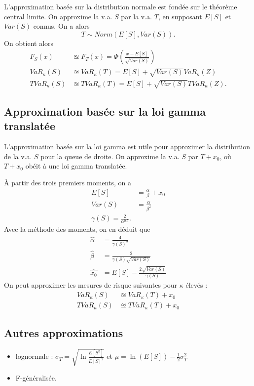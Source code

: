 L'approximation basée sur la distribution normale est fondée sur le théorème central limite. On approxime la v.a. $S$ par la v.a. $T$, en supposant $E[S]$ et $Var(S)$ connus. On a alors
$$T \sim Norm(E[S], Var(S)).$$
On obtient alors
\begin{align*}
	F_S(x)         & \approxeq F_T(x) = \Phi\left(\frac{x - E[S]}{\sqrt{Var(S)}}\right) \\
	VaR_\kappa(S)  & \approxeq VaR_\kappa(T) = E[S] + \sqrt{Var(S)} VaR_\kappa(Z)       \\
	TVaR_\kappa(S) & \approxeq TVaR_\kappa(T) = E[S] + \sqrt{Var(S)} TVaR_\kappa(Z).
\end{align*}

\subsection{Approximation basée sur la loi gamma translatée}

L'approximation basée sur la loi gamma est utile pour approximer la distribution de la v.a. $S$ pour la queue de droite. On approxime la v.a. $S$ par $T + x_0$, où $T + x_0$ obéit à une loi gamma translatée. 

À partir des trois premiers moments, on a 
\begin{align*}
E[S] &= \frac{\alpha}{\beta} + x_0\\
Var(S) &= \frac{\alpha}{\beta^2}\\
\gamma(S) = \frac{2}{\alpha^{0.5}}.
\end{align*}
Avec la méthode des moments, on en déduit que
\begin{align*}
\hat{\alpha} &= \frac{4}{\gamma(S)^2}\\
\hat{\beta} &= \frac{2}{\gamma(S) \sqrt{Var(S)}}\\
\hat{x_0} &= E[S] - \frac{2\sqrt{Var(S)}}{\gamma(S)}
\end{align*}
On peut approximer les mesures de risque suivantes pour $\kappa$ élevés : 
\begin{align*}
	VaR_\kappa(S)  & \approxeq VaR_\kappa(T) + x_0  \\
	TVaR_\kappa(S) & \approxeq TVaR_\kappa(T) + x_0
\end{align*}

\subsection{Autres approximations}

\begin{itemize}
	\item lognormale : $\sigma_T = \sqrt{\ln \frac{E[S^2]}{E[S]^2}}$ et $\mu = \ln(E[S]) - \frac{1}{2}\sigma_T^2$
	\item F-généralisée.
\end{itemize}

